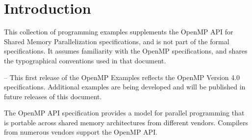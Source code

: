 %
%
%
%
%
%
%
%
%
%

\chapter*{Introduction}
\label{chap:introduction}
This collection of programming examples supplements the OpenMP API for Shared
Memory Parallelization specifications, and is not part of the formal specifications. It
assumes familiarity with the OpenMP specifications, and shares the typographical
conventions used in that document.

\notestart
\noteheader – This first release of the OpenMP Examples reflects the OpenMP Version 4.0
specifications. Additional examples are being developed and will be published in future
releases of this document.
\noteend

The OpenMP API specification provides a model for parallel programming that is
portable across shared memory architectures from different vendors. Compilers from
numerous vendors support the OpenMP API.

